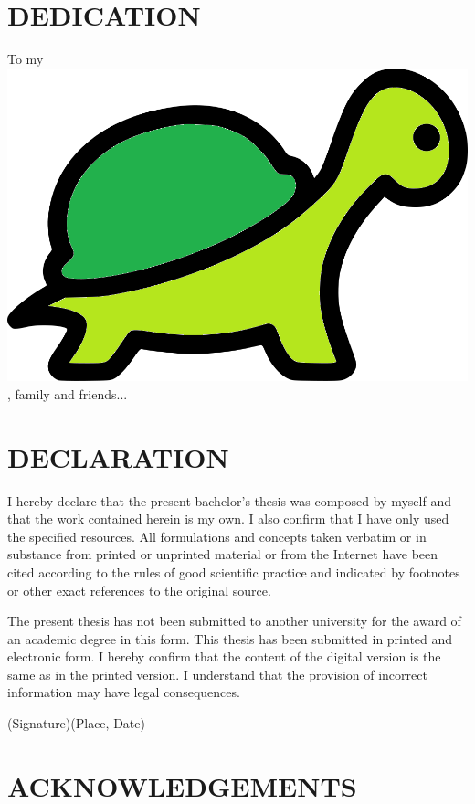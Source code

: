 \documentclass[12pt,twoside]{report}
\numberwithin{equation}{subsection}
\begin{document}
\endgroup

 
\chapter*{DEDICATION}
To my   \includegraphics[scale=0.03]{turtle}, family and friends...

\chapter*{DECLARATION}


I hereby declare that the present bachelor's thesis was composed by myself and that the work contained herein is my own. I also confirm that I have only used the specified resources. All formulations and concepts taken verbatim or in substance from printed or unprinted material or from the Internet have been cited according to the rules of good
scientific practice and indicated by footnotes or other exact references to the original source.

\vline

\noindent The present thesis has not been submitted to another university for the award of an academic
degree in this form. This thesis has been submitted in printed and electronic form. I hereby
confirm that the content of the digital version is the same as in the printed version.
I understand that the provision of incorrect information may have legal consequences.
\vfill

(Signature)\hfill (Place, Date)
\vspace{8.5cm}


\chapter*{ACKNOWLEDGEMENTS}
\end{document}
